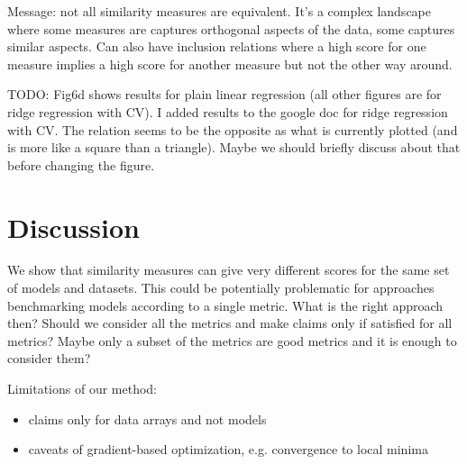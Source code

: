 \documentclass{article} %
\begin{document}



\iffalse%
Message: not all similarity measures are equivalent. It's a complex landscape where some measures are captures orthogonal aspects of the data, some captures similar aspects. Can also have inclusion relations where a high score for one measure implies a high score for another measure but not the other way around.


TODO: Fig6d shows results for plain linear regression (all other figures are for ridge regression with CV). I added results to the google doc for ridge regression with CV.  The relation seems to be the opposite as what is currently plotted (and is more like a square than a triangle). Maybe we should briefly discuss about that before changing the figure.



\section{Discussion}



We show that similarity measures can give very different scores for the same set of models and datasets. This could be potentially problematic for approaches benchmarking models according to a single metric. What is the right approach then? Should we consider all the metrics and make claims only if satisfied for all metrics? Maybe only a subset of the metrics are good metrics and it is enough to consider them?


Limitations of our method:
\begin{itemize}
    \item claims only for data arrays and not models
    \item caveats of gradient-based optimization, e.g. convergence to local minima
\end{itemize}
\end{document}
